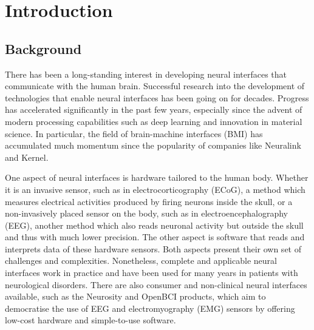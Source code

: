 \chapter{Introduction}

\section{Background}
\label{chapter1-background}

There has been a long-standing interest in developing neural interfaces that communicate with the human brain. Successful research into the development of technologies that enable neural interfaces has been going on for decades. Progress has accelerated significantly in the past few years, especially since the advent of modern processing capabilities such as deep learning and innovation in material science. In particular, the field of brain-machine interfaces (BMI) has accumulated much momentum since the popularity of companies like Neuralink and Kernel.

One aspect of neural interfaces is hardware tailored to the human body. Whether it is an invasive sensor, such as in electrocorticography (ECoG), a method which measures electrical activities produced by firing neurons inside the skull, or a non-invasively placed sensor on the body, such as in electroencephalography (EEG), another method which also reads neuronal activity but outside the skull and thus with much lower precision. The other aspect is software that reads and interprets data of these hardware sensors. Both aspects present their own set of challenges and complexities. Nonetheless, complete and applicable neural interfaces work in practice and have been used for many years in patients with neurological disorders. There are also consumer and non-clinical neural interfaces available, such as the Neurosity and OpenBCI products, which aim to democratise the use of EEG and electromyography (EMG) sensors by offering low-cost hardware and simple-to-use software.




